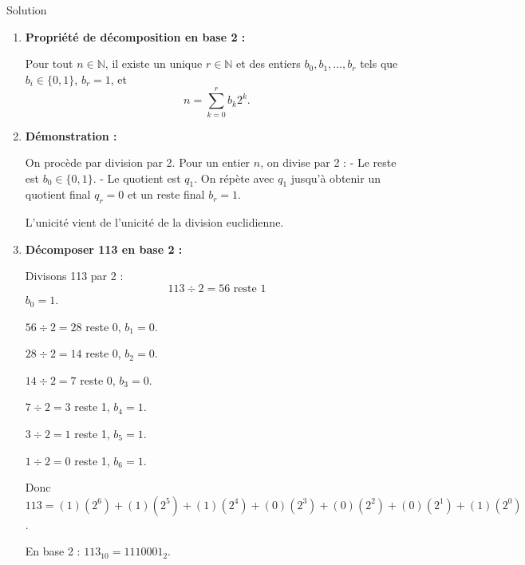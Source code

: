 \documentclass[a4paper,12pt]{article}
\begin{document}
\begin{solutionbox}{Solution}
\begin{enumerate}
    \item \textbf{Propriété de décomposition en base 2 :}

    Pour tout $n \in \mathbb{N}$, il existe un unique $r \in \mathbb{N}$ et des entiers $b_0,b_1,\ldots,b_r$ tels que $b_i \in \{0,1\}$, $b_r=1$, et
    \[
    n=\sum_{k=0}^r b_k 2^k.
    \]

    \item \textbf{Démonstration :}

    On procède par division par 2.  
    Pour un entier $n$, on divise par 2 :  
    - Le reste est $b_0 \in \{0,1\}$.
    - Le quotient est $q_1$.  
    On répète avec $q_1$ jusqu’à obtenir un quotient final $q_r=0$ et un reste final $b_r=1$.

    L'unicité vient de l’unicité de la division euclidienne.

    \item \textbf{Décomposer 113 en base 2 :}

    Divisons 113 par 2 :
    \[
    113 \div 2 = 56 \text{ reste } 1
    \]
    $b_0=1$.

    $56 \div 2 = 28$ reste 0, $b_1=0$.

    $28 \div 2=14$ reste 0, $b_2=0$.

    $14 \div 2=7$ reste 0, $b_3=0$.

    $7 \div 2=3$ reste 1, $b_4=1$.

    $3 \div 2=1$ reste 1, $b_5=1$.

    $1 \div 2=0$ reste 1, $b_6=1$.

    Donc $113=(1)(2^6)+(1)(2^5)+(1)(2^4)+(0)(2^3)+(0)(2^2)+(0)(2^1)+(1)(2^0)$.

    En base 2 : $113_{10}=1110001_2$.
\end{enumerate}
\end{solutionbox}
\end{document}
